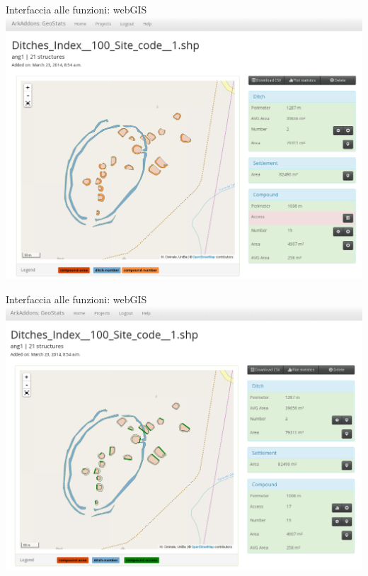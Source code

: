 \documentclass[xcolor=svgnames]{beamer}
\begin{document}
        \begin{frame}{Interfaccia alle funzioni: webGIS}
            \includegraphics[width=1\textwidth]{img/shp-detail-3}
        \end{frame}

        \begin{frame}{Interfaccia alle funzioni: webGIS}
            \includegraphics[width=1\textwidth]{img/shp-detail-4}
        \end{frame}
\end{document}
